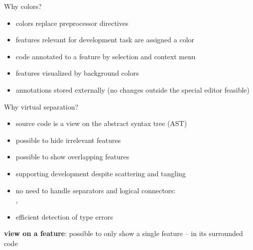 \begin{frame}{\myframetitle\mysource{\cide}}
	\begin{mycolumns}[widths={70},animation=none]
	\mynextcolumn
		\begin{example}{Why colors?}
			\begin{itemize}
				\item colors replace preprocessor directives
				\item features relevant for development task are assigned a color
				\item code annotated to a feature by selection and context menu
				\item features visualized by background colors
				\item annotations stored externally (no changes outside the special editor feasible)
			\end{itemize}
		\end{example}
	\end{mycolumns}
\end{frame}

\begin{frame}{\myframetitle\mysource{\cide}}
	\begin{mycolumns}[widths={65},animation=none]
	\mynextcolumn
		\begin{example}{Why virtual separation?}
			\begin{itemize}
				\item source code is a view on the abstract syntax tree (AST)
				\item possible to hide irrelevant features
				\item possible to show overlapping features
				\item supporting development despite scattering and tangling
				\item no need to handle separators and logical connectors:\\\mycite{\texttt{,}}, \mycite{\texttt{||}}
				\item efficient detection of type errors \lectureanalyses
			\end{itemize}
		\end{example}
	\end{mycolumns}
\end{frame}

\begin{frame}{\myframetitle\mysource{\cide}}
	\begin{example}{}\centering
		\textbf{view on a feature}: possible to only show a single feature -- in its surrounded code
	\end{example}
\end{frame}

